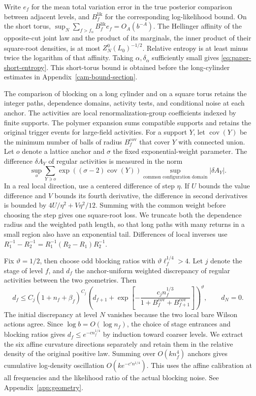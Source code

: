 \documentclass[11pt,a4paper]{article}
\numberwithin{equation}{section}
\begin{document}
Write \(e_f\) for the mean total variation error in the true posterior comparison between adjacent levels, and \(B_f^{\mathrm{lik}}\) for the corresponding log-likelihood bound. On the short torus, \(\sup_N\sum_{f>f_\alpha}B_f^{\mathrm{lik}}e_f=O_A(b^{-A})\). The Hellinger affinity of the opposite-cut joint law and the product of its marginals, the inner product of their square-root densities, is at most \(Z_N^0(L_0)^{-1/2}\). Relative entropy is at least minus twice the logarithm of that affinity. Taking \(\alpha,\delta_\alpha\) sufficiently small gives \eqref{eq:paper-short-entropy}. This short-torus bound is obtained before the long-cylinder estimates in Appendix~\ref{cam-bound-section}.

The comparison of blocking on a long cylinder and on a square torus retains the integer paths, dependence domains, activity tests, and conditional noise at each anchor. The activities are local renormalization-group coefficients indexed by finite supports. The polymer expansion sums compatible supports and retains the original trigger events for large-field activities. For a support \(Y\), let \(\operatorname{cov}(Y)\) be the minimum number of balls of radius \(B_f^{\mathrm{cov}}\) that cover \(Y\) with connected union. Let \(o\) denote a lattice anchor and \(\sigma\) the fixed exponential-weight parameter. The difference \(\delta A_Y\) of regular activities is measured in the norm
\[
 \sup_o\sum_{Y\ni o}\exp((\sigma-2)\operatorname{cov}(Y))
 \sup_{\text{common configuration domain}}|\delta A_Y|.
\]
In a real local direction, use a centered difference of step \(\eta\). If \(U\) bounds the value difference and \(V\) bounds its fourth derivative, the difference in second derivatives is bounded by \(4U/\eta^2+V\eta^2/12\). Summing with the common weight before choosing the step gives one square-root loss. We truncate both the dependence radius and the weighted path length, so that long paths with many returns in a small region also have an exponential tail. Differences of local inverses use \(R_1^{-1}-R_2^{-1}=R_1^{-1}(R_2-R_1)R_2^{-1}\).

Fix \(\vartheta=1/2\), then choose odd blocking ratios with \(\vartheta\ell_f^{1/4}>4\). Let \(j\) denote the stage of level \(f\), and \(d_f\) the anchor-uniform weighted discrepancy of regular activities between the two geometries. Then
\begin{equation}
 d_f\le C_j(1+n_f+\widehat\beta_f)^{C_j}
   \left(d_{f+1}
      +\exp\!\left[-\frac{c_j n_f^{1/3}}
       {1+B_f^{\mathrm{cov}}+B_{f+1}^{\mathrm{cov}}}\right]
   \right)^\vartheta,\qquad d_N=0 .
 \label{eq:paper-shape-recurrence}
\end{equation}
The initial discrepancy at level \(N\) vanishes because the two local bare Wilson actions agree. Since \(\log b=O(\log n_f)\), the choice of stage entrances and blocking ratios gives \(d_f\le e^{-c n_f^{1/4}}\) by induction toward coarser levels. We extract the six affine curvature directions separately and retain them in the relative density of the original positive law. Summing over \(O(kn_f^4)\) anchors gives cumulative log-density oscillation \(O(ke^{-c'n^{1/4}})\). This uses the affine calibration at all frequencies and the likelihood ratio of the actual blocking noise. See Appendix~\ref{app:geometry}.
\end{document}

